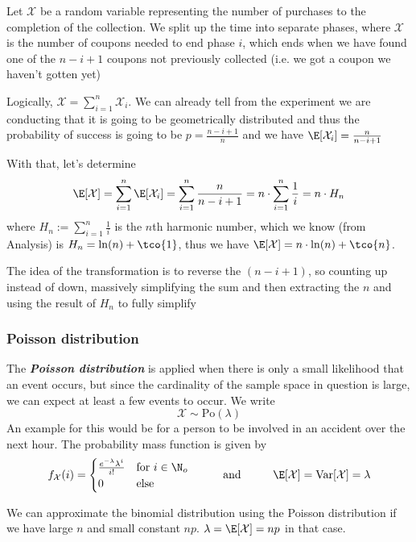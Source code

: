 Let $\mathcal{X}$ be a random variable representing the number of purchases to the completion of the collection. We split up the time into separate phases, where $\mathcal{X}$ is the number of coupons needed to end phase $i$, which ends when we have found one of the $n - i + 1$ coupons not previously collected (i.e. we got a coupon we haven't gotten yet)

Logically, $\mathcal{X} = \sum_{i = 1}^{n} \mathcal{X}_i$. We can already tell from the experiment we are conducting that it is going to be geometrically distributed and thus the probability of success is going to be $p = \frac{n - i + 1}{n}$ and we have $\E[\mathcal{X}_i] = \frac{n}{n - i + 1}$

With that, let's determine
\[
    \E[\mathcal{X}] = \sum_{i = 1}^{n} \E[\mathcal{X}_i] = \sum_{i = 1}^{n} \frac{n}{n - i + 1} = n \cdot \sum_{i = 1}^{n} \frac{1}{i} = n \cdot H_n
\]
where $H_n := \sum_{i = 1}^{n} \frac{1}{i}$ is the $n$th harmonic number, which we know (from Analysis) is $H_n = \ln(n) + \tco{1}$, thus we have $\E[\mathcal{X}] = n \cdot \ln(n) + \tco{n}$.

The idea of the transformation is to reverse the $(n - i + 1)$, so counting up instead of down, massively simplifying the sum and then extracting the $n$ and using the result of $H_n$ to fully simplify


\subsubsection{Poisson distribution}
The \textbf{\textit{Poisson distribution}} is applied when there is only a small likelihood that an event occurs, but since the cardinality of the sample space in question is large, we can expect at least a few events to occur.
We write
\[
    \mathcal{X} \sim \text{Po}(\lambda)
\]
An example for this would be for a person to be involved in an accident over the next hour. The probability mass function is given by
\[
    f_{\mathcal{X}}(i) = \begin{cases}
        \frac{e^{-\lambda}\lambda^i}{i!} & \text{for } i \in \N_o \\
        0                                & \text{else}
    \end{cases}
    \hspace{1cm} \text{and} \hspace{1cm} \E[\mathcal{X}] = \text{Var}[\mathcal{X}] = \lambda
\]


We can approximate the binomial distribution using the Poisson distribution if we have large $n$ and small constant $np$. $\lambda = \E[\mathcal{X}] = np$ in that case.
